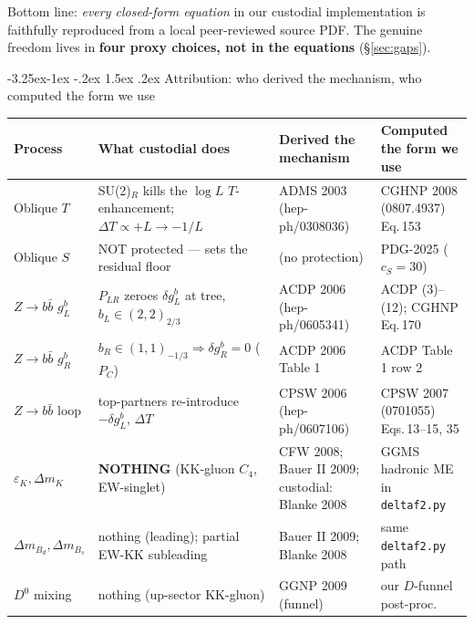 \documentclass[11pt]{article}
\makeatletter
\renewcommand\subsection{\@startsection{subsection}{2}{\z@}%
  {-3.25ex\@plus -1ex \@minus -.2ex}%
  {1.5ex \@plus .2ex}%
  {\normalfont\large\bfseries\color{accent}}}
\makeatother
\begin{document}
Bottom line: \emph{every closed-form equation} in our custodial implementation is
faithfully reproduced from a local peer-reviewed source PDF. The genuine freedom
lives in \textbf{four proxy choices, not in the equations} (\S\ref{sec:gaps}).

\subsection{Attribution: who derived the mechanism, who computed the form we use}

\begin{center}
\footnotesize
\renewcommand{\arraystretch}{1.3}
\setlength{\tabcolsep}{4pt}
\begin{tabular}{@{}>{\raggedright\arraybackslash}p{}>{\raggedright\arraybackslash}p{}>{\raggedright\arraybackslash}p{}>{\raggedright\arraybackslash}p{}@{}}
\toprule
\textbf{Process} & \textbf{What custodial does} & \textbf{Derived the mechanism} & \textbf{Computed the form we use} \\
\midrule
Oblique $T$ & SU(2)$_R$ kills the $\log L$ $T$-enhancement; $\Delta T{\propto}{+}L\to{-}1/L$ & ADMS 2003 (hep-ph/0308036) & CGHNP 2008 (0807.4937) Eq.\,153 \\
Oblique $S$ & NOT protected --- sets the residual floor & (no protection) & PDG-2025 ($c_S{=}30$) \\
$Z\to b\bar b$ $g_L^b$ & $P_{LR}$ zeroes $\delta g_L^b$ at tree, $b_L\in(2,2)_{2/3}$ & ACDP 2006 (hep-ph/0605341) & ACDP (3)--(12); CGHNP Eq.\,170 \\
$Z\to b\bar b$ $g_R^b$ & $b_R\in(1,1)_{-1/3}\Rightarrow\delta g_R^b{=}0$ ($P_C$) & ACDP 2006 Table 1 & ACDP Table 1 row 2 \\
$Z\to b\bar b$ loop & top-partners re-introduce $-\delta g_L^b$, $\Delta T$ & CPSW 2006 (hep-ph/0607106) & CPSW 2007 (0701055) Eqs.\,13--15, 35 \\
$\varepsilon_K,\Delta m_K$ & \textbf{NOTHING} (KK-gluon $C_4$, EW-singlet) & CFW 2008; Bauer II 2009; custodial: Blanke 2008 & GGMS hadronic ME in \texttt{deltaf2.py} \\
$\Delta m_{B_d},\Delta m_{B_s}$ & nothing (leading); partial EW-KK subleading & Bauer II 2009; Blanke 2008 & same \texttt{deltaf2.py} path \\
$D^0$ mixing & nothing (up-sector KK-gluon) & GGNP 2009 (funnel) & our $D$-funnel post-proc. \\
\bottomrule
\end{tabular}
\end{center}
\end{document}
